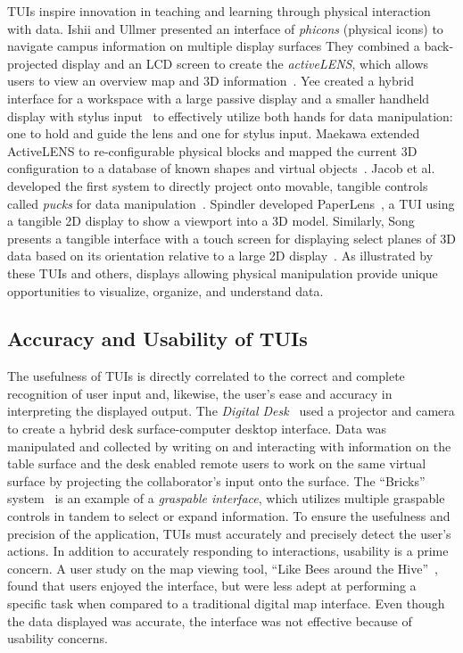 \documentclass[preprint]{elsarticle}
\begin{document}
TUIs inspire innovation in teaching and learning through physical
interaction with data.  Ishii and Ullmer presented an interface of
{\em phicons} (physical icons) to navigate campus information on 
multiple display surfaces   They combined a back-projected display
and an LCD screen to create the {\em activeLENS}, which allows users
to view an overview map and 3D information~\cite{Ishii97tangiblebits}.
%
Yee created a hybrid interface for a workspace with a large passive
display and a smaller handheld display with stylus input~\cite{642613}
to effectively utilize both hands for data manipulation: one to hold
and guide the lens and one for stylus input.
%
Maekawa extended ActiveLENS to re-configurable physical blocks and mapped the
current 3D configuration to a database of known shapes and virtual
objects~\cite{1517704}.
%
Jacob et al. developed the first system to directly project onto
movable, tangible controls called {\em pucks} for data manipulation~\cite{Jacob01atangible}.
%
Spindler developed PaperLens~\cite{Spindler:2009:PAM:1731903.1731920},
a TUI using a tangible 2D display to show a viewport into a 3D model.
%
Similarly, Song presents a tangible interface with a touch screen for
displaying select planes of 3D data based on its orientation relative to
a large 2D display~\cite{Song:2011:WEA:1978942.1979140}.
%
As illustrated by these TUIs and others, displays allowing physical
manipulation provide unique opportunities to visualize, organize,
and understand data.

\subsection{Accuracy and Usability of TUIs}

The usefulness of TUIs is directly correlated to the correct and
complete recognition of user input and, likewise, the user's ease and
accuracy in interpreting the displayed output. 
%
The \emph{Digital Desk}~\cite{159630} used a projector and camera to
create a hybrid desk surface-computer desktop interface.  Data was 
manipulated and collected by writing on and interacting with
information on the table surface and the desk enabled remote users to
work on the same virtual surface by projecting the collaborator's 
input onto the surface.
%
The ``Bricks'' system~\cite{223964} is an example of a {\em graspable
  interface}, which utilizes multiple graspable controls in tandem to
select or expand information.  To ensure the usefulness and precision
of the application, TUIs must accurately and precisely
detect the user's actions.
%
In addition to accurately responding to interactions, usability is a
prime concern.  A user study on the map viewing tool, ``Like Bees
around the Hive''~\cite{1518991}, found that users enjoyed the interface,
but were less adept at performing a specific task when compared to a
traditional digital map interface.  Even though the data displayed was
accurate, the interface was not effective because of usability
concerns.  
\end{document}
